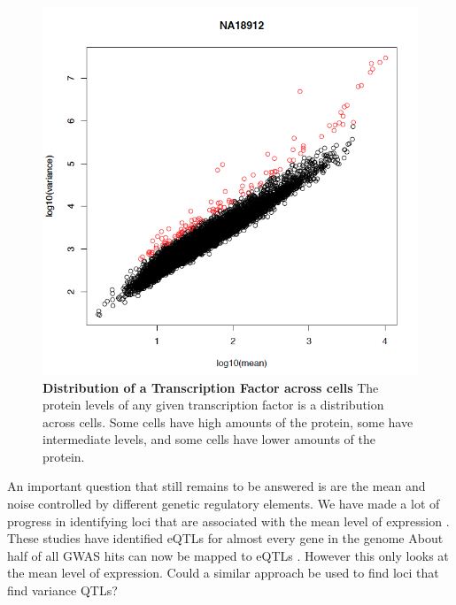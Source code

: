 \begin{figure}[t!]  
    \centering
    \includegraphics[width=\linewidth, scale=0.25]{figures/intro/intro_outlier1.png}
    \caption[Distribution of a Transcription Factor across cells.]{%
        \textbf{Distribution of a Transcription Factor across cells}
        The protein levels of any given transcription factor is a distribution across cells. Some cells have high amounts of the protein, some have intermediate levels, and some cells have lower amounts of the protein.
    }
    \label{fig:intro1}
\end{figure}

An important question that still remains to be answered is are the mean and noise controlled by different genetic regulatory elements.
We have made a lot of progress in identifying loci that are associated with the mean level of expression \cite{gtex_consortium_genetic_2017} \cite{eqtlgen} \cite{more}. These studies have identified eQTLs for almost every gene in the genome \cite{} About half of all GWAS hits can now be mapped to eQTLs \cite{}. However this only looks at the mean level of expression. Could a similar approach be used to find loci that find variance QTLs?

